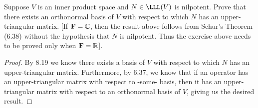 \begin{exercise}{14}
  Suppose $V$ is an inner product space and $N\in\LLL(V)$ is nilpotent. Prove that there exists an orthonormal basis of $V$ with respect to which $N$ has an upper-triangular matrix. [If $\mathbf{F}=\mathbb{C}$, then the result above follows from Schur's Theorem (6.38) without the hypothesis that $N$ is nilpotent. Thus the exercise above needs to be proved only when $\mathbf{F}=\mathbb{R}$].
\end{exercise}
\begin{proof}
 By 8.19 we know there exists a basis of $V$ with respect to which $N$ has an upper-triangular matrix. Furthermore, by 6.37, we know that if an operator has an upper-triangular matrix with respect to -some- basis, then it has an upper-triangular matrix with respect to an orthonormal basis of $V$, giving us the desired result.
\end{proof}
